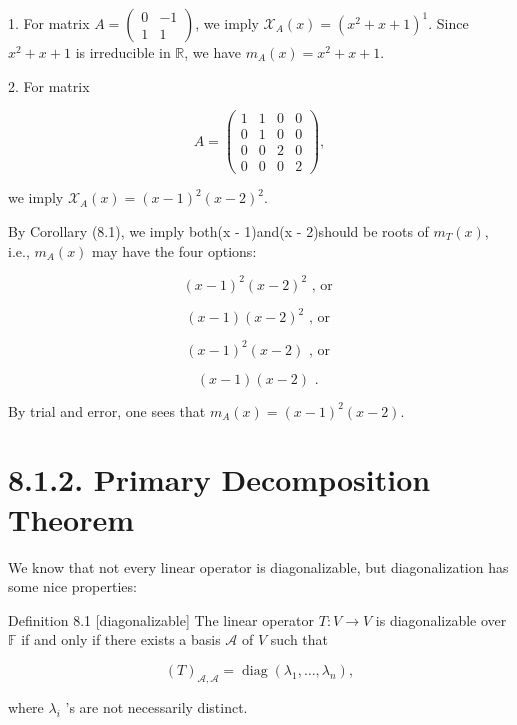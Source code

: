 \documentclass[11pt]{article}
\begin{document}
1. For matrix \(A = \left( \begin{matrix} 0 &  - 1 \\  1 & 1 \end{matrix}\right)\), we imply \({\mathcal{X}}_{A}\left( x\right)  = {\left( {x}^2 + x + 1\right) }^1\). Since \({x}^2 + x + 1\) is irreducible in \(\mathbb{R}\), we have \({m}_{A}\left( x\right)  = {x}^2 + x + 1\).

2. For matrix

\[
A = \left( \begin{array}{llll} 1 & 1 & 0 & 0 \\  0 & 1 & 0 & 0 \\  0 & 0 & 2 & 0 \\  0 & 0 & 0 & 2 \end{array}\right) ,
\]

we imply \({\mathcal{X}}_{A}\left( x\right)  = {\left( x - 1\right) }^2{\left( x - 2\right) }^2\).

By Corollary (8.1), we imply both(x - 1)and(x - 2)should be roots of \({m}_{T}\left( x\right)\), i.e., \({m}_{A}\left( x\right)\) may have the four options:

\[
{\left( x - 1\right) }^2{\left( x - 2\right) }^2\text{ , or }
\]

\[
\left( {x - 1}\right) {\left( x - 2\right) }^2\text{ , or }
\]

\[
{\left( x - 1\right) }^2\left( {x - 2}\right) \text{ , or }
\]

\[
\left( {x - 1}\right) \left( {x - 2}\right) \text{ . }
\]

By trial and error, one sees that \({m}_{A}\left( x\right)  = {\left( x - 1\right) }^2\left( {x - 2}\right)\).

\section*{8.1.2. Primary Decomposition Theorem}

We know that not every linear operator is diagonalizable, but diagonalization has some nice properties:

Definition 8.1 [diagonalizable] The linear operator \(T : V \rightarrow  V\) is diagonalizable over \(\mathbb{F}\) if and only if there exists a basis \(\mathcal{A}\) of \(V\) such that

\[
{\left( T\right) }_{\mathcal{A},\mathcal{A}} = \operatorname{diag}\left( {{\lambda }_1,\ldots ,{\lambda }_n}\right) ,
\]

where \({\lambda }_{i}\) ’s are not necessarily distinct.
\end{document}
